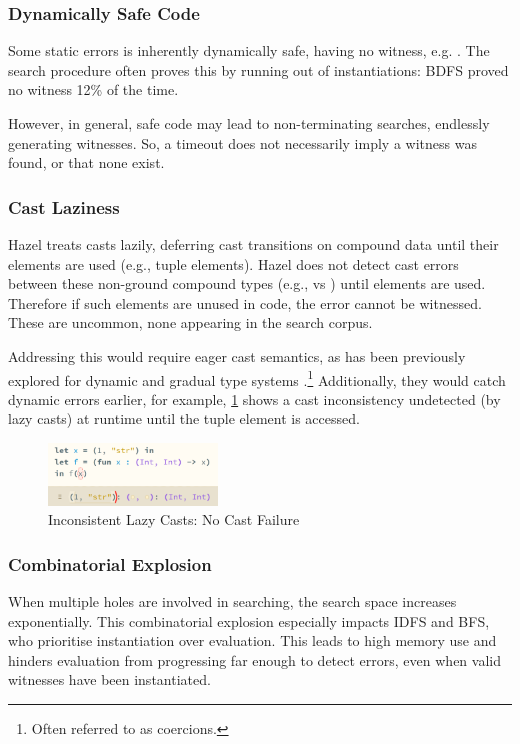 \subsubsection{Dynamically Safe Code}
Some static errors is inherently dynamically safe, having no witness, e.g. . The search procedure often proves this by running out of instantiations: BDFS proved no witness 12\% of the time. 

However, in general, safe code may lead to non-terminating searches, endlessly generating witnesses. So, a timeout does not necessarily imply a witness was found, or that none exist.

\subsubsection{Cast Laziness}\label{sec:EvalCastLaziness}
Hazel treats casts lazily, deferring cast transitions on compound data until their elements are used (e.g., tuple elements). Hazel does not detect cast errors between these non-ground compound types (e.g., \code{[Int]} vs \code{[String]}) until elements are used. Therefore if such elements are unused in code, the error cannot be witnessed. These are uncommon, none appearing in the search corpus.

Addressing this would require eager cast semantics, as has been previously explored for dynamic and gradual type systems \cite{EagerCasts, GradualEagerCasts}.\footnote{Often referred to as coercions.} Additionally, they would catch dynamic errors earlier, for example, \cref{fig:LazyCastError} shows a cast inconsistency undetected (by lazy casts) at runtime until the tuple element is accessed.
\begin{figure}[h]
\centering
\includegraphics[width=0.4\textwidth]{Media/Figures/cast_laziness_no_error}
\caption{Inconsistent Lazy Casts: No Cast Failure}
\label{fig:LazyCastError}
\end{figure}

\subsubsection{Combinatorial Explosion}
When multiple holes are involved in searching, the search space increases exponentially. This combinatorial explosion especially impacts IDFS and BFS, who prioritise instantiation over evaluation. This leads to high memory use and hinders evaluation from progressing far enough to detect errors, even when valid witnesses have been instantiated.

